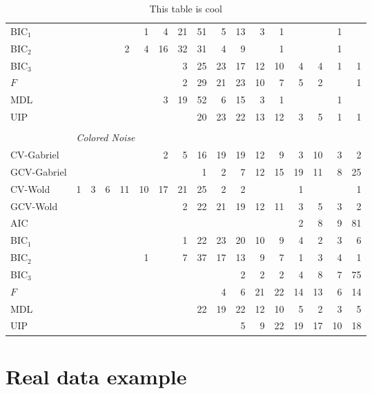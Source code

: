 \begin{table}
\begin{tabular}{lrrrrrrrrrrrrrrrr}
 BIC$_1$ &  &  &  &  &  1 &  4 &  21 &  51 &  5 &  13 &  3 &  1 &  &  &  1 & \\ 
 BIC$_2$ &  &  &  &  2 &  4 &  16 &  32 &  31 &  4 &  9 &  &  1 &  &  &  1 & \\ 
 BIC$_3$ &  &  &  &  &  &  &  3 &  25 &  23 &  17 &  12 &  10 &  4 &  4 &  1 &  1\\ 
 $F$ &  &  &  &  &  &  &  2 &  29 &  21 &  23 &  10 &  7 &  5 &  2 &  &  1\\ 
 MDL &  &  &  &  &  &  3 &  19 &  52 &  6 &  15 &  3 &  1 &  &  &  1 & \\ 
 UIP &  &  &  &  &  &  &  &  20 &  23 &  22 &  13 &  12 &  3 &  5 &  1 &  1\\ 
        \\
        &\multicolumn{16}{l}{\scriptsize{\textit{Colored Noise}}} \\
CV-Gabriel &  &  &  &  &  &  2 &  5 &  16 &  19 &  19 &  12 &  9 &  3 &  10 &  3 &  2\\ 
 GCV-Gabriel &  &  &  &  &  &  &  &  1 &  2 &  7 &  12 &  15 &  19 &  11 &  8 &  25\\ 
 CV-Wold &  1 &  3 &  6 &  11 &  10 &  17 &  21 &  25 &  2 &  2 &  &  &  1 &  &  &  1\\ 
 GCV-Wold &  &  &  &  &  &  &  2 &  22 &  21 &  19 &  12 &  11 &  3 &  5 &  3 &  2\\ 
 AIC &  &  &  &  &  &  &  &  &  &  &  &  &  2 &  8 &  9 &  81\\ 
 BIC$_1$ &  &  &  &  &  &  &  1 &  22 &  23 &  20 &  10 &  9 &  4 &  2 &  3 &  6\\ 
 BIC$_2$ &  &  &  &  &  1 &  &  7 &  37 &  17 &  13 &  9 &  7 &  1 &  3 &  4 &  1\\ 
 BIC$_3$ &  &  &  &  &  &  &  &  &  &  2 &  2 &  2 &  4 &  8 &  7 &  75\\ 
 $F$ &  &  &  &  &  &  &  &  &  4 &  6 &  21 &  22 &  14 &  13 &  6 &  14\\ 
 MDL &  &  &  &  &  &  &  &  22 &  19 &  22 &  12 &  10 &  5 &  2 &  3 &  5\\ 
 UIP &  &  &  &  &  &  &  &  &  &  5 &  9 &  22 &  19 &  17 &  10 &  18\\ 
        \bottomrule
    \end{tabular}
    \caption{
        This table is cool
    }
\end{table}


\clearpage

\section{Real data example}

